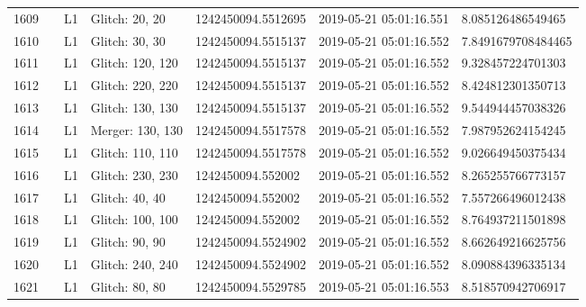 \begin{longtable}{lllllll}
1609 &                                                    &       L1 &    Glitch: 20, 20 &  1242450094.5512695 &  2019-05-21 05:01:16.551 &   8.085126486549465 \\
1610 &                                                    &       L1 &    Glitch: 30, 30 &  1242450094.5515137 &  2019-05-21 05:01:16.552 &  7.8491679708484465 \\
1611 &                                                    &       L1 &  Glitch: 120, 120 &  1242450094.5515137 &  2019-05-21 05:01:16.552 &   9.328457224701303 \\
1612 &                                                    &       L1 &  Glitch: 220, 220 &  1242450094.5515137 &  2019-05-21 05:01:16.552 &   8.424812301350713 \\
1613 &                                                    &       L1 &  Glitch: 130, 130 &  1242450094.5515137 &  2019-05-21 05:01:16.552 &   9.544944457038326 \\
1614 &                                                    &       L1 &  Merger: 130, 130 &  1242450094.5517578 &  2019-05-21 05:01:16.552 &   7.987952624154245 \\
1615 &                                                    &       L1 &  Glitch: 110, 110 &  1242450094.5517578 &  2019-05-21 05:01:16.552 &   9.026649450375434 \\
1616 &                                                    &       L1 &  Glitch: 230, 230 &   1242450094.552002 &  2019-05-21 05:01:16.552 &   8.265255766773157 \\
1617 &                                                    &       L1 &    Glitch: 40, 40 &   1242450094.552002 &  2019-05-21 05:01:16.552 &   7.557266496012438 \\
1618 &                                                    &       L1 &  Glitch: 100, 100 &   1242450094.552002 &  2019-05-21 05:01:16.552 &   8.764937211501898 \\
1619 &                                                    &       L1 &    Glitch: 90, 90 &  1242450094.5524902 &  2019-05-21 05:01:16.552 &   8.662649216625756 \\
1620 &                                                    &       L1 &  Glitch: 240, 240 &  1242450094.5524902 &  2019-05-21 05:01:16.552 &   8.090884396335134 \\
1621 &                                                    &       L1 &    Glitch: 80, 80 &  1242450094.5529785 &  2019-05-21 05:01:16.553 &   8.518570942706917 \\

\end{longtable}
